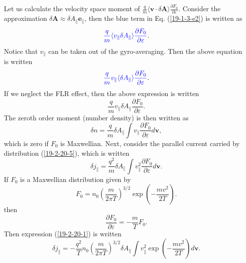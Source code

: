 \documentclass{llncs}
\newcommand{\tmcolor}[2]{{\color{#1}{#2}}}
\begin{document}
Let us calculate the velocity space moment of $\frac{q}{m} \langle \mathbf{v}
\cdot \delta \mathbf{A} \rangle \frac{\partial F_0}{\partial \varepsilon}$.
Consider the approximation $\delta \mathbf{A} \approx \delta A_{\parallel}
\mathbf{e}_{\parallel}$, then the blue term in Eq. (\ref{19-1-3-e2}) is
written as
\begin{equation}
  \tmcolor{blue}{\frac{q}{m} \langle v_{\parallel} \delta A_{\parallel}
  \rangle \frac{\partial F_0}{\partial \varepsilon}} .
\end{equation}
Notice that $v_{\parallel}$ can be taken out of the gyro-averaging. Then the
above equation is written
\begin{equation}
  \tmcolor{blue}{\frac{q}{m} v_{\parallel} \langle \delta A_{\parallel}
  \rangle \frac{\partial F_0}{\partial \varepsilon}} .
\end{equation}
If we neglect the FLR effect, then the above expression is written
\begin{equation}
  \label{19-2-20-5} \frac{q}{m} v_{\parallel} \delta A_{\parallel}
  \frac{\partial F_0}{\partial \varepsilon} .
\end{equation}
The zeroth order moment (number density) is then written as
\begin{equation}
  \delta n = \frac{q}{m} \delta A_{\parallel} \int v_{\parallel}
  \frac{\partial F_0}{\partial \varepsilon} d\mathbf{v},
\end{equation}
which is zero if $F_0$ is Maxwellian. Next, consider the parallel current
carried by distribution (\ref{19-2-20-5}), which is written
\begin{equation}
  \label{19-2-20-1} \delta j_{\parallel} = \frac{q^2}{m} \delta A_{\parallel}
  \int v_{\parallel}^2 \frac{\partial F_0}{\partial \varepsilon} d\mathbf{v}.
\end{equation}
If $F_0$ is a Maxwellian distribution given by
\begin{equation}
  F_0 = n_0 \left( \frac{m}{2 \pi T} \right)^{3 / 2} \exp \left( - \frac{m
  v^2}{2 T} \right) .
\end{equation}
then
\begin{equation}
  \frac{\partial F_0}{\partial \varepsilon} = - \frac{m}{T} F_0 .
\end{equation}
Then expression (\ref{19-2-20-1}) is written
\begin{equation}
  \label{19-2-20-4} \delta j_{\parallel} = - \frac{q^2}{T} n_0 \left(
  \frac{m}{2 \pi T} \right)^{3 / 2} \delta A_{\parallel} \int v_{\parallel}^2
  \exp \left( - \frac{m v^2}{2 T} \right) d\mathbf{v}.
\end{equation}
\end{document}
